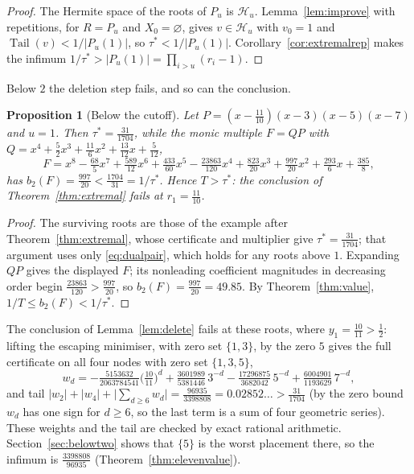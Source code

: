 \documentclass[11pt]{article}
\newtheorem{proposition}[theorem]{Proposition}
\theoremstyle{definition}
\theoremstyle{plain}
\DeclareMathOperator{\Tail}{Tail}
\begin{document}
\begin{proof}
The Hermite space of the roots of $P_u$ is $\mathcal H_u$.  Lemma~\ref{lem:improve}
with repetitions, for $R=P_u$ and $X_0=\varnothing$, gives $v\in\mathcal H_u$
with $v_0=1$ and $\Tail(v)<1/|P_u(1)|$, so $\tau^*<1/|P_u(1)|$.
Corollary~\ref{cor:extremalrep} makes the infimum
$1/\tau^*>|P_u(1)|=\prod_{i>u}(r_i-1)$.
\end{proof}

Below $2$ the deletion step fails, and so can the conclusion.

\begin{proposition}[Below the cutoff]\label{prop:belowtwo}
Let $P=(x-\tfrac{11}{10})(x-3)(x-5)(x-7)$ and $u=1$.  Then
$\tau^*=\tfrac{31}{1704}$, while the monic multiple $F=QP$ with
$Q=x^4+\tfrac52x^3+\tfrac{11}6x^2+\tfrac{13}{12}x+\tfrac5{12}$,
\[
  F=x^8-\tfrac{68}5x^7+\tfrac{589}{12}x^6+\tfrac{433}{60}x^5
  -\tfrac{23863}{120}x^4+\tfrac{823}{20}x^3+\tfrac{997}{20}x^2
  +\tfrac{293}6x+\tfrac{385}8,
\]
has $b_2(F)=\tfrac{997}{20}<\tfrac{1704}{31}=1/\tau^*$.  Hence
$T>\tau^*$: the conclusion of Theorem~\ref{thm:extremal} fails at
$r_1=\tfrac{11}{10}$.
\end{proposition}

\begin{proof}
The surviving roots are those of the example after
Theorem~\ref{thm:extremal}, whose certificate and multiplier give
$\tau^*=\tfrac{31}{1704}$; that argument uses only \eqref{eq:dualpair},
which holds for any roots above $1$.  Expanding $QP$ gives the displayed
$F$; its nonleading coefficient magnitudes in decreasing order begin
$\tfrac{23863}{120}>\tfrac{997}{20}$, so $b_2(F)=\tfrac{997}{20}=49.85$.  By
Theorem~\ref{thm:value}, $1/T\le b_2(F)<1/\tau^*$.
\end{proof}

The conclusion of Lemma~\ref{lem:delete} fails at these roots, where
$y_1=\tfrac{10}{11}>\tfrac12$:
lifting the escaping minimiser, with zero set $\{1,3\}$, by the zero $5$
gives the full certificate on all four nodes with zero set $\{1,3,5\}$,
\[
  w_d=-\tfrac{5153632}{2063784541}\bigl(\tfrac{10}{11}\bigr)^d
  +\tfrac{3601989}{5381446}\,3^{-d}
  -\tfrac{17296875}{3682042}\,5^{-d}
  +\tfrac{6004901}{1193629}\,7^{-d},
\]
and tail $|w_2|+|w_4|+\bigl|\sum_{d\ge6}w_d\bigr|
=\tfrac{96935}{3398808}=0.02852\ldots>\tfrac{31}{1704}$ (by the zero bound
$w_d$ has one sign for $d\ge6$, so the last term is a sum of four
geometric series).  These weights and the tail are checked by exact rational
arithmetic.
Section~\ref{sec:belowtwo} shows that $\{5\}$ is the worst placement there,
so the infimum is $\tfrac{3398808}{96935}$ (Theorem~\ref{thm:elevenvalue}).
\end{document}
